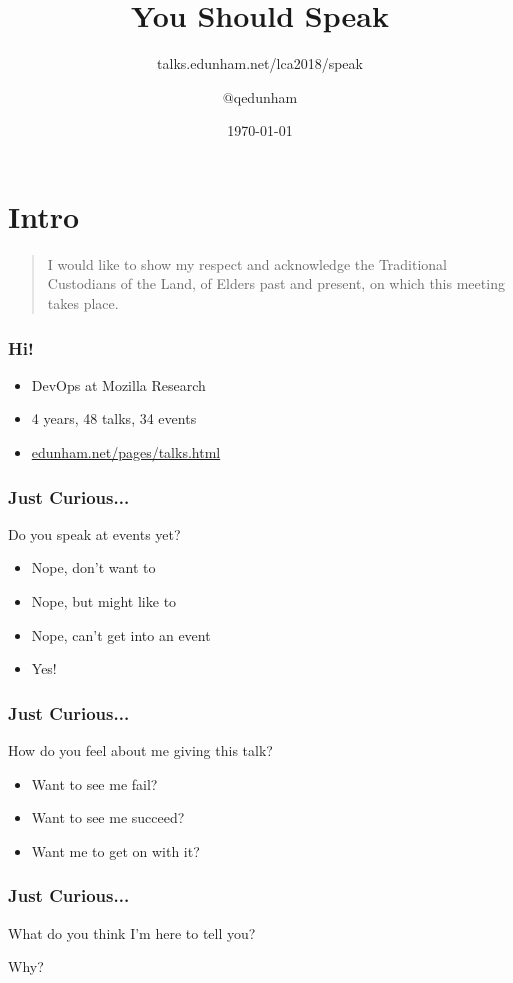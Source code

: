 \documentclass{beamer}
\title{You Should Speak}
\subtitle{talks.edunham.net/lca2018/speak}
\author{$@$qedunham}
\institute{LinuxConf Australia}
\date{\today}
\begin{document}
\begin{frame}[fragile]
\titlepage
\end{frame}

\section{Intro}

\begin{frame}[fragile]
\begin{quote}
I would like to show my respect and acknowledge the Traditional
Custodians of the Land, of Elders past and present, on which this meeting
takes place.
\end{quote}
\end{frame}

\begin{frame}[fragile]
\frametitle{Hi!}
\begin{itemize}[<+(1)->]
\item DevOps at Mozilla Research
\item 4 years, 48 talks, 34 events
\item \url{edunham.net/pages/talks.html}
\end{itemize}
\end{frame}

\begin{frame}[fragile]
\frametitle{Just Curious...}
Do you speak at events yet?
\begin{itemize}[<+(1)->]
\item Nope, don't want to
\item Nope, but might like to
\item Nope, can't get into an event
\item Yes!
\end{itemize}
\end{frame}

\begin{frame}[fragile]
\frametitle{Just Curious...}
How do you feel about me giving this talk?
\begin{itemize}[<+(1)->]
\item Want to see me fail?
\item Want to see me succeed?
\item Want me to get on with it?
\end{itemize}
\end{frame}

\begin{frame}[fragile]
\frametitle{Just Curious...}
What do you think I'm here to tell you?

Why?
\end{frame}
\end{document}
